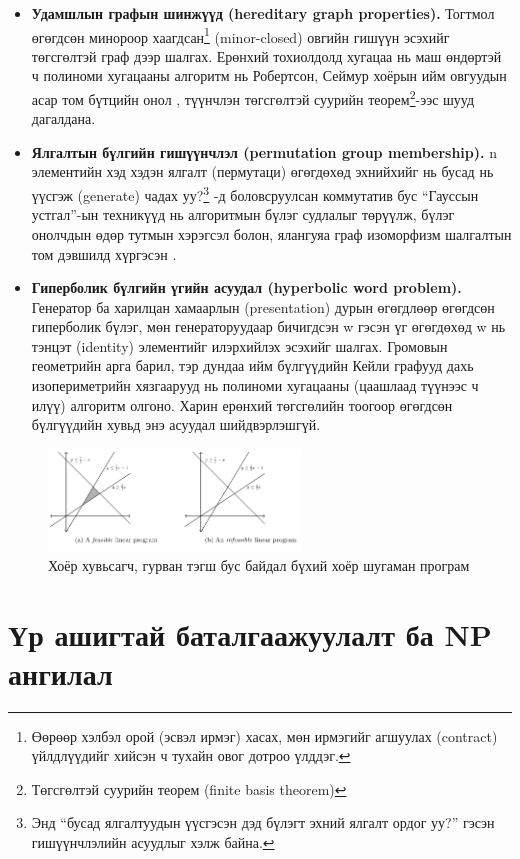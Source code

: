 \begin{itemize}
  \item \textbf{Удамшлын графын шинжүүд (hereditary graph properties).}  Тогтмол өгөгдсөн минороор хаагдсан\footnote{Өөрөөр хэлбэл орой (эсвэл ирмэг) хасах, мөн ирмэгийг агшуулах (contract) үйлдлүүдийг хийсэн ч тухайн овог дотроо үлддэг.} (minor-closed) овгийн гишүүн эсэхийг төгсгөлтэй граф дээр шалгах. Ерөнхий тохиолдолд хугацаа нь маш өндөртэй ч полиноми хугацааны алгоритм нь Робертсон, Сеймур хоёрын ийм овгуудын асар том бүтцийн онол \cite{RS95}, түүнчлэн төгсгөлтэй суурийн теорем\footnote{Төгсгөлтэй суурийн теорем (finite basis theorem)}-ээс шууд дагалдана.
  \item \textbf{Ялгалтын бүлгийн гишүүнчлэл (permutation group membership).}  n элементийн хэд хэдэн ялгалт (пермутаци) өгөгдөхөд эхнийхийг нь бусад нь үүсгэж (generate) чадах уу?\footnote{Энд “бусад ялгалтуудын үүсгэсэн дэд бүлэгт эхний ялгалт ордог уу?” гэсэн гишүүнчлэлийн асуудлыг хэлж байна.} \cite{Sim70, FHL80}-д боловсруулсан коммутатив бус “Гауссын устгал”-ын техникүүд нь алгоритмын бүлэг судлалыг төрүүлж, бүлэг онолчдын өдөр тутмын хэрэгсэл болон, ялангуяа граф изоморфизм шалгалтын том дэвшилд хүргэсэн \cite{Bab15}.
  \item \textbf{Гиперболик бүлгийн үгийн асуудал (hyperbolic word problem).} Генератор ба харилцан хамаарлын (presentation) дурын өгөгдлөөр өгөгдсөн гиперболик бүлэг, мөн генераторуудаар бичигдсэн w гэсэн үг өгөгдөхөд w нь тэнцэт (identity) элементийг илэрхийлэх эсэхийг шалгах. Громовын геометрийн арга барил, тэр дундаа ийм бүлгүүдийн Кейли графууд дахь изопериметрийн хязгаарууд \cite{Gro87} нь полиноми хугацааны (цаашлаад түүнээс ч илүү) алгоритм олгоно. Харин ерөнхий төгсгөлийн тоогоор өгөгдсөн бүлгүүдийн хувьд энэ асуудал шийдвэрлэшгүй.
\end{itemize}


\begin{figure}[h]
  \centering
  \includegraphics[width=0.6\textwidth]{figs/4.png}
  \caption{Хоёр хувьсагч, гурван тэгш бус байдал бүхий хоёр шугаман програм}
  \label{fig:3-2}
\end{figure}


\section{Үр ашигтай баталгаажуулалт ба NP ангилал}


